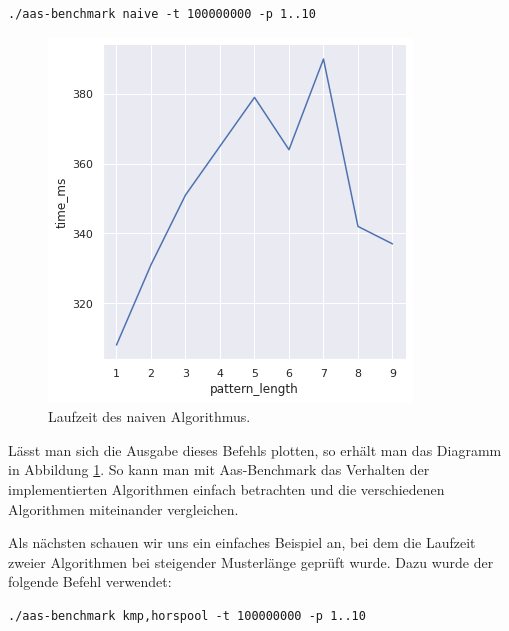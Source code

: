 \documentclass[twocolumn]{article}
\begin{document}
\begin{lstlisting}[breaklines=true,autogobble=true]
    ./aas-benchmark naive -t 100000000 -p 1..10
\end{lstlisting}

\begin{figure}
    \includegraphics[width=\linewidth]{assets/graph_1.png}
    \caption{Laufzeit des naiven Algorithmus.}
    \label{fig:runtime_naive}
\end{figure}

Lässt man sich die Ausgabe dieses Befehls plotten, so erhält man das Diagramm in Abbildung \ref{fig:runtime_naive}. So kann man mit Aas-Benchmark das Verhalten der implementierten Algorithmen einfach betrachten und die verschiedenen Algorithmen miteinander vergleichen.

Als nächsten schauen wir uns ein einfaches Beispiel an, bei dem die Laufzeit zweier Algorithmen bei steigender Musterlänge geprüft wurde. Dazu wurde der folgende Befehl verwendet:

\begin{lstlisting}[breaklines=true,autogobble=true]
    ./aas-benchmark kmp,horspool -t 100000000 -p 1..10
\end{lstlisting}
\end{document}
